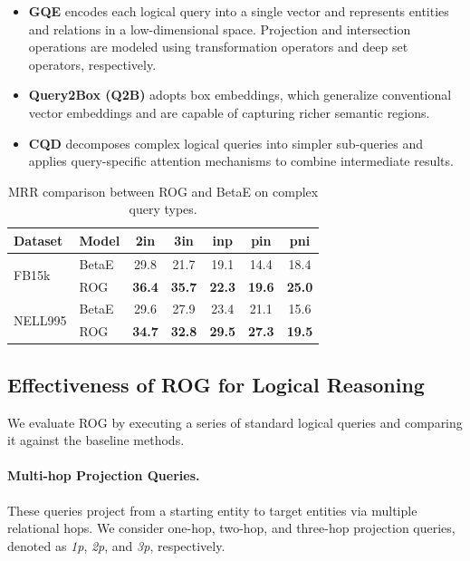 \documentclass[11pt]{article}
\begin{document}
\begin{itemize}
    \item \textbf{GQE} encodes each logical query into a single vector and represents entities and relations in a low-dimensional space. Projection and intersection operations are modeled using transformation operators and deep set operators, respectively.
    \item \textbf{Query2Box (Q2B)} adopts box embeddings, which generalize conventional vector embeddings and are capable of capturing richer semantic regions.
    \item \textbf{CQD} decomposes complex logical queries into simpler sub-queries and applies query-specific attention mechanisms to combine intermediate results.
\end{itemize}



\begin{table}[t]
\centering
\small
\begin{tabular}{llccccc}
\toprule
Dataset & Model & 2in & 3in & inp & pin & pni \\
\midrule
\multirow{2}{*}{FB15k}
& BetaE & 29.8 & 21.7 & 19.1 & 14.4 & 18.4 \\
& ROG   & \textbf{36.4} & \textbf{35.7} & \textbf{22.3} & \textbf{19.6} & \textbf{25.0} \\
\midrule
\multirow{2}{*}{NELL995}
& BetaE & 29.6 & 27.9 & 23.4 & 21.1 & 15.6 \\
& ROG   & \textbf{34.7} & \textbf{32.8} & \textbf{29.5} & \textbf{27.3} & \textbf{19.5} \\
\bottomrule
\end{tabular}
\caption{MRR comparison between ROG and BetaE on complex query types.}
\label{tab:complex}
\end{table}


\subsection{Effectiveness of ROG for Logical Reasoning}

We evaluate ROG by executing a series of standard logical queries and comparing it against the baseline methods.

\paragraph{Multi-hop Projection Queries.}
These queries project from a starting entity to target entities via multiple relational hops.
We consider one-hop, two-hop, and three-hop projection queries, denoted as \textit{1p}, \textit{2p}, and \textit{3p}, respectively.
\end{document}
